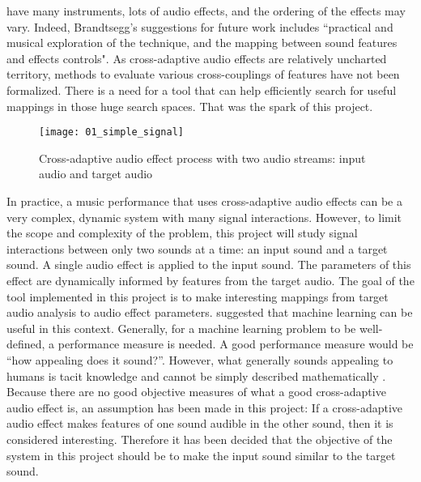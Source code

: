 have many instruments, lots of audio effects, and the ordering of the effects may vary. Indeed, Brandtsegg's suggestions for future work includes ``practical and musical exploration of the technique, and the mapping between sound features and effects controls". As cross-adaptive audio effects are relatively uncharted territory, methods to evaluate various cross-couplings of features have not been formalized. There is a need for a tool that can help efficiently search for useful mappings in those huge search spaces. That was the spark of this project.

\begin{figure}[h]
    \centering
    \texttt{[image: 01\_simple\_signal]}
    \caption{Cross-adaptive audio effect process with two audio streams: input audio and target audio}
    \label{fig:simple_signal}
\end{figure}

In practice, a music performance that uses cross-adaptive audio effects can be a very complex, dynamic system with many signal interactions. However, to limit the scope and complexity of the problem, this project will study signal interactions between only two sounds at a time: an input sound and a target sound. A single audio effect is applied to the input sound. The parameters of this effect are dynamically informed by features from the target audio. The goal of the tool implemented in this project is to make interesting mappings from target audio analysis to audio effect parameters. \cite{brandtsegg2015} suggested that machine learning can be useful in this context. Generally, for a machine learning problem to be well-defined, a performance measure is needed. A good performance measure would be “how appealing does it sound?”. However, what generally sounds appealing to humans is tacit knowledge and cannot be simply described mathematically \citep{schmidhuber2009}. Because there are no good objective measures of what a good cross-adaptive audio effect is, an assumption has been made in this project: If a cross-adaptive audio effect makes features of one sound audible in the other sound, then it is considered interesting. Therefore it has been decided that the objective of the system in this project should be to make the input sound similar to the target sound.

